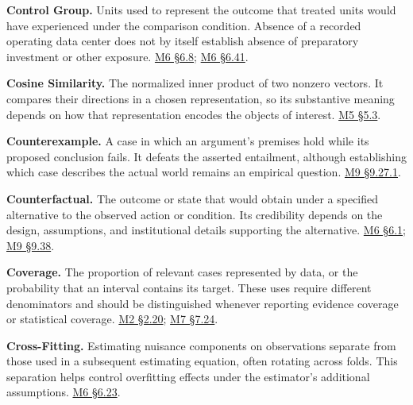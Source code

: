 \noindent\textbf{Control Group.} Units used to represent the outcome that treated
units would have experienced under the comparison condition. Absence of
a recorded operating data center does not by itself establish absence of
preparatory investment or other exposure.
\href{Marketing_Analytics_Lecture_Notes.pdf\#M06-difference-in-differences-and-a-counterfactual-trend}{M6
§6.8};
\href{Marketing_Analytics_Lecture_Notes.pdf\#M06-phantom-projects-and-the-meaning-of-a-control}{M6
§6.41}.

\noindent\textbf{Cosine Similarity.} The normalized inner product of two nonzero
vectors. It compares their directions in a chosen representation, so its
substantive meaning depends on how that representation encodes the
objects of interest.
\href{Marketing_Analytics_Lecture_Notes.pdf\#M05-embeddings-and-semantic-similarity}{M5
§5.3}.

\noindent\textbf{Counterexample.} A case in which an argument's premises hold
while its proposed conclusion fails. It defeats the asserted entailment,
although establishing which case describes the actual world remains an
empirical question.
\hyperref[M09-premises-consequences-and-counterexamples]{M9
§9.27.1}.

\noindent\textbf{Counterfactual.} The outcome or state that would obtain under a
specified alternative to the observed action or condition. Its
credibility depends on the design, assumptions, and institutional
details supporting the alternative.
\href{Marketing_Analytics_Lecture_Notes.pdf\#M06-define-the-treatment-outcome-and-estimand}{M6
§6.1};
\hyperref[M09-pricing-evidence-in-a-u.s.-antitrust-case]{M9
§9.38}.

\noindent\textbf{Coverage.} The proportion of relevant cases represented by data,
or the probability that an interval contains its target. These uses
require different denominators and should be distinguished whenever
reporting evidence coverage or statistical coverage.
\href{Marketing_Analytics_Lecture_Notes.pdf\#M02-access-to-evidence-changes-the-review-sample}{M2
§2.20};
\href{Marketing_Analytics_Lecture_Notes.pdf\#M07-demand-intervals-and-the-distribution-of-forecast-errors}{M7
§7.24}.

\noindent\textbf{Cross-Fitting.} Estimating nuisance components on observations
separate from those used in a subsequent estimating equation, often
rotating across folds. This separation helps control overfitting effects
under the estimator's additional assumptions.
\href{Marketing_Analytics_Lecture_Notes.pdf\#M06-adjustment-for-selected-discount-intensity}{M6
§6.23}.

